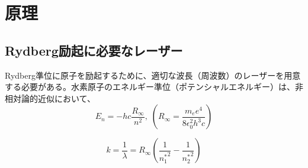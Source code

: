 \documentclass[dvipdfmx]{jsarticle}
\begin{document}
\clearpage
\section{原理}
\subsection{Rydberg励起に必要なレーザー}
\label{sec:rydberg}
Rydberg準位に原子を励起するために、適切な波長（周波数）のレーザーを用意する必要がある。水素原子のエネルギー準位（ポテンシャルエネルギー）は、非相対論的近似において、
\begin{equation}
\label{rydberg}
 E_n = -hc\frac{R_{\infty}}{n^2},\; \left(R_{\infty} = \frac{m_e e^4}{8 \epsilon_0^2 h^3 c} \right)
\end{equation}

\begin{equation}
 k = \frac{1}{\lambda} = R_{\infty}\left( \frac{1}{{n_1^*}^2} - \frac{1}{{n_2^*}^2} \right)
\end{equation}
\end{document}
